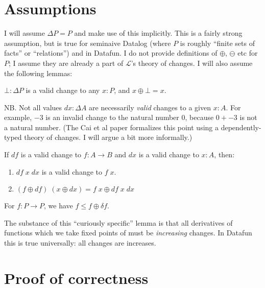 \documentclass[a5,libertine]{rntz}
\newcommand{\mc}[1]{\ensuremath{\mathcal{#1}}}
\newcommand{\dv}{\delta}
\begin{document}

\section{Assumptions}

I will assume $\Delta P = P$ and make use of this implicitly. This is a fairly
strong assumption, but is true for seminaive Datalog (where $P$ is roughly
``finite sets of facts'' or ``relations'') and in Datafun. I do not provide
definitions of $\oplus$, $\ominus$ etc for $P$; I assume they are already a part
of $\mc{L}$'s theory of changes. I will also assume the following lemmas:

\begin{lemma}
  \label{lem:bot-change}
  $\bot : \Delta P$ is a valid change to any $x : P$, and $x \oplus \bot = x$.
\end{lemma}

NB. Not all values $dx : \Delta{A}$ are necessarily \emph{valid} changes to a
given $x : A$. For example, $-3$ is an invalid change to the natural number $0$,
because $0 + -3$ is not a natural number. (The Cai et al paper formalizes this
point using a dependently-typed theory of changes. I will argue a bit more
informally.)

\begin{lemma}
  \label{lem:fun-change}
  If $df$ is a valid change to $f : A \to B$ and $dx$ is a valid change to $x :
  A$, then:
  \begin{enumerate}
  \item $df\; x\; dx$ is a valid change to $f\;x$.
  \item \( (f \oplus df)\;(x \oplus dx) = f\;x \oplus df\;x\;dx \)
  \end{enumerate}
\end{lemma}

\begin{lemma}  \label{lem:curiously-specific}
  For $f : P \to P$, we have $f \le f \oplus \dv f$.
\end{lemma}

The substance of this ``curiously specific'' lemma is that all derivatives of
functions which we take fixed points of must be \emph{increasing} changes. In
Datafun this is true universally: all changes are increases.


\section{Proof of correctness}
\end{document}
